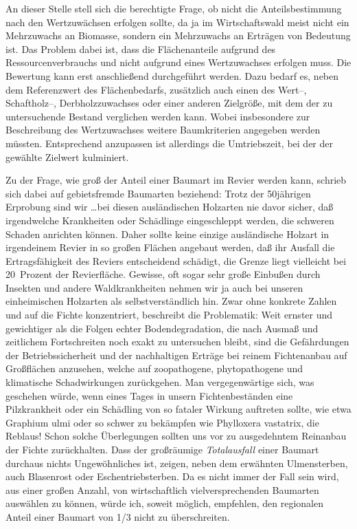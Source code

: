 \documentclass[twocolumn]{scrartcl}
\begin{document}
An dieser Stelle stell sich die berechtigte Frage, ob nicht die
Anteilsbestimmung nach den Wertzuwächsen erfolgen sollte, da ja im
Wirtschaftswald meist nicht ein Mehrzuwachs an Biomasse, sondern ein Mehrzuwachs
an Erträgen von Bedeutung ist. Das Problem dabei ist, dass die Flächenanteile
aufgrund des Ressourcenverbrauchs und nicht aufgrund eines Wertzuwachses
erfolgen muss. Die Bewertung kann erst anschließend durchgeführt werden. Dazu
bedarf es, neben dem Referenzwert des Flächenbedarfs, zusätzlich auch einen des
Wert--, Schaftholz--, Derbholzzuwachses oder einer anderen Zielgröße,  mit dem
der zu untersuchende Bestand verglichen werden kann. Wobei insbesondere zur
Beschreibung des Wertzuwachses weitere Baumkriterien angegeben werden müssten.
Entsprechend anzupassen ist allerdings die Umtriebszeit, bei der der gewählte
Zielwert kulminiert.

Zu der Frage, wie groß der Anteil einer Baumart im Revier werden kann,
schrieb \citet[S.~233]{wiedemann1951Ertragskunde} sich dabei auf
gebietsfremde Baumarten beziehend: \frqq Trotz der 50jährigen
Erprobung sind wir \dots bei diesen ausländischen Holzarten nie davor
sicher, daß irgendwelche Krankheiten oder Schädlinge eingeschleppt
werden, die schweren Schaden anrichten können. Daher sollte keine
einzige ausländische Holzart in irgendeinem Revier in so großen
Flächen angebaut werden, daß ihr Ausfall die Ertragsfähigkeit des
Reviers entscheidend schädigt, die Grenze liegt vielleicht bei
20~Prozent der Revierfläche. Gewisse, oft sogar sehr große Einbußen
durch Insekten und andere Waldkrankheiten nehmen wir ja auch bei
unseren einheimischen Holzarten als selbstverständlich hin.\flqq{}
Zwar ohne konkrete Zahlen und auf die Fichte konzentriert, beschreibt
\citet[S.~394]{assmann1961Waldertraskunde} die Problematik: \frqq Weit
ernster und gewichtiger als die Folgen echter Bodendegradation, die
nach Ausmaß und zeitlichem Fortschreiten noch exakt zu untersuchen
bleibt, sind die Gefährdungen der Betriebssicherheit und der
nachhaltigen Erträge bei reinem Fichtenanbau auf Großflächen
anzusehen, welche auf zoopathogene, phytopathogene und klimatische
Schadwirkungen zurückgehen. Man vergegenwärtige sich, was geschehen
würde, wenn eines Tages in unsern Fichtenbeständen eine Pilzkrankheit
oder ein Schädling von so fataler Wirkung auftreten sollte, wie etwa
Graphium ulmi oder so schwer zu bekämpfen wie Phylloxera vastatrix,
die Reblaus! Schon solche Überlegungen sollten uns vor zu ausgedehntem
Reinanbau der Fichte zurückhalten.\flqq{} Dass der großräumige
\emph{Totalausfall} einer Baumart durchaus nichts Ungewöhnliches ist,
zeigen, neben dem erwähnten Ulmensterben, auch Blasenrost oder
Eschentriebsterben. Da es nicht immer der Fall sein wird, aus einer
großen Anzahl, von wirtschaftlich vielversprechenden Baumarten
auswählen zu können, würde ich, soweit möglich, empfehlen, den
regionalen Anteil einer Baumart von 1/3 nicht zu überschreiten.
\end{document}
